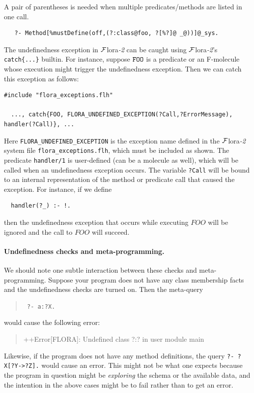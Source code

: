\documentclass[11pt]{article}
\newcommand{\FLORA}{{\mbox{\sc ${\cal F}${lora}\rm\emph{-2}}}\xspace}
\begin{document}
A pair of parentheses is needed when multiple
predicates/methods are listed in one call.
\begin{verbatim}
   ?- Method[%mustDefine(off,(?:class@foo, ?[%?]@ _@))]@_sys.
\end{verbatim}

The undefinedness exception in \FLORA can be caught using \FLORA's {\tt
  catch\{...\}} builtin. For instance, suppose
$\tt FOO$ is a predicate or an F-molecule whose execution might trigger the
undefinedness exception. Then we can catch this exception as follows:
\begin{verbatim}
#include "flora_exceptions.flh"

  ..., catch{FOO, FLORA_UNDEFINED_EXCEPTION(?Call,?ErrorMessage), handler(?Call)}, ...
\end{verbatim}
Here {\tt FLORA\_UNDEFINED\_EXCEPTION} is the exception name defined in the
\FLORA system file {\tt flora\_exceptions.flh}, which must be included as
shown.
The predicate {\tt handler/1} is user-defined (can be a molecule as well),
which will be called when an undefinedness exception occurs. The variable
{\tt ?Call} will be bound to an internal representation of the method or
predicate call that caused the exception. For instance, if we define
\begin{verbatim}
  handler(?_) :- !.  
\end{verbatim}
then the undefinedness exception that occurs while executing $FOO$ will be
ignored and the call to $FOO$ will succeed.


\paragraph{Undefinedness checks and meta-programming.}
We should note one subtle interaction between these checks and
meta-programming. Suppose your program does not have any class membership
facts and the undefinedness checks are turned on. Then the meta-query
\begin{quote}
 {\tt
       ?- a:?X.
 }
\end{quote}
would cause the following error:
\begin{quote}
 ++Error[FLORA]: Undefined class ?:? in user module main  
\end{quote}
Likewise, if the program does not have any method definitions,
the query {\tt ?- ?X[?Y->?Z].} would cause an error. This might not
be what one expects because the program in question might be
\emph{exploring} the schema or the available data, and the intention in the
above cases might be to fail rather than to get an error.
\end{document}
